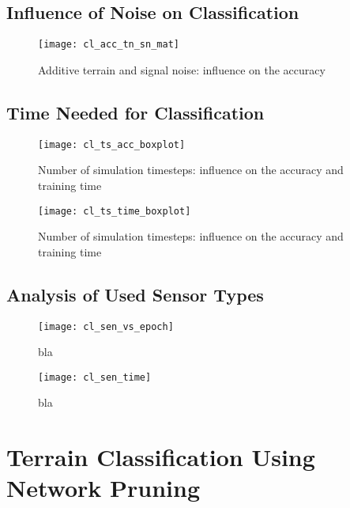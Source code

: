 \subsection{Influence of Noise on Classification} \label{ssec:final_configuration}

\begin{figure}[H]
  \centering
  \texttt{[image: cl\_acc\_tn\_sn\_mat]}
  \caption{Additive terrain and signal noise: influence on the accuracy}
  \label{fig:acc_tn_sn_mat}
\end{figure}

\subsection{Time Needed for Classification} \label{ssec:number_of_timesteps}

\begin{figure}[H]
  \centering
  \texttt{[image: cl\_ts\_acc\_boxplot]}
  \caption{Number of simulation timesteps: influence on the accuracy and training time}
  \label{fig:ts_acc_boxplot}
\end{figure}

\begin{figure}[H]
  \centering
  \texttt{[image: cl\_ts\_time\_boxplot]}
  \caption{Number of simulation timesteps: influence on the accuracy and training time}
  \label{fig:ts_time_boxplot}
\end{figure}

\subsection{Analysis of Used Sensor Types} \label{ssec:analysis_of_used_sensor_types}

\begin{figure}[H]
  \centering
  \texttt{[image: cl\_sen\_vs\_epoch]}
  \caption{bla}
  \label{fig:sen_vs_epoch}
\end{figure}

\begin{figure}[H]
  \centering
  \texttt{[image: cl\_sen\_time]}
  \caption{bla}
  \label{fig:sen_time}
\end{figure}


\section[Terrain Classification Using Network Pruning]{Terrain Classification Using Network Pruning} \label{sec:pa_amter}

